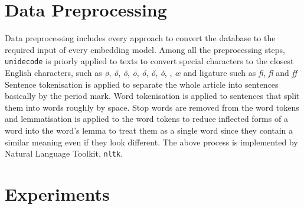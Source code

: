 \section{Data Preprocessing}
Data preprocessing includes every approach to convert the database to the required input of every embedding model.
Among all the preprocessing steps, \texttt{unidecode} is priorly applied to texts to convert special characters to the closest English characters, such as \textit{\o}, \textit{\^o}, \textit{\~o}, \textit{\=o}, \textit{\'o}, \textit{\u o}, \textit{\v o}, \textit{\oo}, \textit{\oe} and ligature such as \textit{fi}, \textit{fl} and \textit{ff}
Sentence tokenisation is applied to separate the whole article into sentences basically by the period mark.
Word tokenisation is applied to sentences that split them into words roughly by space.
Stop words are removed from the word tokens and lemmatisation is applied to the word tokens to reduce inflected forms of a word into the word's lemma to treat them as a single word since they contain a similar meaning even if they look different.
The above process is implemented by Natural Language Toolkit, \texttt{nltk}.

\section{Experiments}
